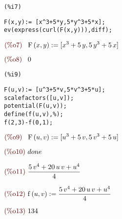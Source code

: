 \documentclass{article}
\begin{document}
\noindent
\begin{minipage}[t]{8ex}{\color{red}\bf
\begin{verbatim}
(%i7) 
\end{verbatim}}
\end{minipage}
\begin{minipage}[t]{\textwidth}{\color{blue}
\begin{verbatim}
F(x,y):= [x^3+5*y,5*y^3+5*x];
ev(express(curl(F(x,y))),diff);
\end{verbatim}}
\end{minipage}
\begin{math}\displaystyle
\parbox{8ex}{\color{labelcolor}(\%o7) }
\mathrm{F}\left( x,y\right) :=[{x}^{3}+5\,y,5\,{y}^{3}+5\,x]
\end{math}

\begin{math}\displaystyle
\parbox{8ex}{\color{labelcolor}(\%o8) }
0
\end{math}


\noindent
\begin{minipage}[t]{8ex}{\color{red}\bf
\begin{verbatim}
(%i9) 
\end{verbatim}}
\end{minipage}
\begin{minipage}[t]{\textwidth}{\color{blue}
\begin{verbatim}
F(u,v):= [u^3+5*v,5*v^3+5*u];
scalefactors([u,v]);
potential(F(u,v));
define(f(u,v),%);
f(2,3)-f(0,1);
\end{verbatim}}
\end{minipage}
\begin{math}\displaystyle
\parbox{8ex}{\color{labelcolor}(\%o9) }
\mathrm{F}\left( u,v\right) :=[{u}^{3}+5\,v,5\,{v}^{3}+5\,u]
\end{math}

\begin{math}\displaystyle
\parbox{8ex}{\color{labelcolor}(\%o10) }
done
\end{math}

\begin{math}\displaystyle
\parbox{8ex}{\color{labelcolor}(\%o11) }
\frac{5\,{v}^{4}+20\,u\,v+{u}^{4}}{4}
\end{math}

\begin{math}\displaystyle
\parbox{8ex}{\color{labelcolor}(\%o12) }
\mathrm{f}\left( u,v\right) :=\frac{5\,{v}^{4}+20\,u\,v+{u}^{4}}{4}
\end{math}

\begin{math}\displaystyle
\parbox{8ex}{\color{labelcolor}(\%o13) }
134
\end{math}
\end{document}
